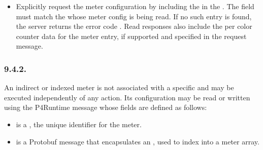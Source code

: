 \documentclass[11pt]{article}
\begin{document}
{\begin{itemize}
\item{}
Explicitly request the meter configuration by including the 
in the . The  field must match the
 whose meter config is being read. If no such entry is found, the
server returns the error code . Read responses also include the
per color counter data for the meter entry, if supported and specified in
the request message.%
\end{itemize}%

\subsubsection{9.4.2.\hspace*{0.5em}}\label{sec-meterentry}%

\noindent{}An indirect or indexed meter is not associated with a specific  and
may be executed independently of any action. Its configuration may be read or
written using the P4Runtime  message whose fields are defined as
follows:%

\begin{itemize}%

\item{}
 is a , the unique identifier for the meter.%

\item{}
 is a Protobuf message that encapsulates an , used to index into
a meter array.%


\end{itemize}}
\end{document}
